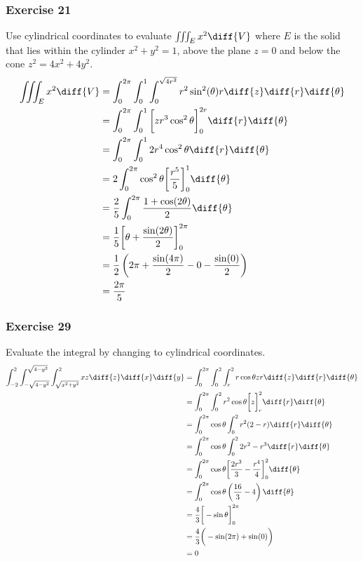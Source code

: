 \documentclass{math}
\begin{document}
\subsubsection*{Exercise 21}
Use cylindrical coordinates to evaluate \( \iiint_{E}x^2\diff{V} \) where
\( E \) is the solid that lies within the cylinder \( x^2+y^2 = 1 \), above
the plane \( z = 0 \) and below the cone \( z^2 = 4x^2+4y^2 \).
\begin{align*}
  \iiint_{E}x^2\diff{V} &=
    \int_{0}^{2\pi}\int_{0}^{1}\int_{0}^{\sqrt{4r^2}}
    r^2\sin^2(\theta)r\diff{z}\diff{r}\diff{\theta} \\
  &= \int_{0}^{2\pi}\int_{0}^{1}\bigg[zr^3\cos^2\theta\bigg]_{0}^{2r}
    \diff{r}\diff{\theta} \\
  &= \int_{0}^{2\pi}\int_{0}^{1}2r^4\cos^2\theta\diff{r}\diff{\theta} \\
  &= 2\int_{0}^{2\pi}\cos^2\theta\bigg[\frac{r^5}{5}\bigg]_{0}^{1}
    \diff{\theta} \\
  &= \frac{2}{5}\int_{0}^{2\pi}\frac{1+\cos(2\theta)}{2}\diff{\theta} \\
  &= \frac{1}{5}\bigg[\theta+\frac{\sin(2\theta)}{2}\bigg]_{0}^{2\pi} \\
  &= \frac{1}{2}\left(2\pi+\frac{\sin(4\pi)}{2}-0-\frac{\sin(0)}{2}\right) \\
  &= \frac{2\pi}{5}
\end{align*}

\subsubsection*{Exercise 29}
Evaluate the integral by changing to cylindrical coordinates.
\begin{align*}
  \int_{-2}^{2}\int_{-\sqrt{4-y^2}}^{\sqrt{4-y^2}}\int_{\sqrt{x^2+y^2}}^{2}
    xz\diff{z}\diff{x}\diff{y} &= \int_{0}^{2\pi}\int_{0}^{2}\int_{r}^{2}
    r\cos\theta zr\diff{z}\diff{r}\diff{\theta} \\
  &= \int_{0}^{2\pi}\int_{0}^{2}r^2\cos\theta\bigg[z\bigg]_{r}^{2}
    \diff{r}\diff{\theta} \\
  &= \int_{0}^{2\pi}\cos\theta\int_{0}^{2}r^2(2-r)\diff{r}\diff{\theta} \\
  &= \int_{0}^{2\pi}\cos\theta\int_{0}^{2}2r^2-r^3\diff{r}\diff{\theta} \\
  &= \int_{0}^{2\pi}\cos\theta\bigg[\frac{2r^3}{3}-\frac{r^4}{4}\bigg]_{0}^{2}
    \diff{\theta} \\
  &= \int_{0}^{2\pi}\cos\theta\left(\frac{16}{3}-4\right)\diff{\theta} \\
  &= \frac{4}{3}\bigg[-\sin\theta\bigg]_{0}^{2\pi} \\
  &= \frac{4}{3}\bigg(-\sin(2\pi)+\sin(0)\bigg) \\
  &= 0
\end{align*}
\end{document}
